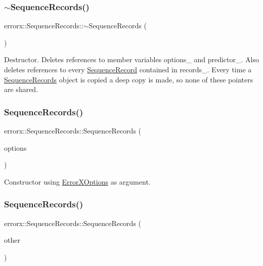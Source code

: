 \subsubsection{\texorpdfstring{$\sim$\+Sequence\+Records()}{~SequenceRecords()}}
{\footnotesize\ttfamily errorx\+::\+Sequence\+Records\+::$\sim$\+Sequence\+Records (\begin{DoxyParamCaption}{ }\end{DoxyParamCaption})}

Destructor. Deletes references to member variables options\+\_\+ and predictor\+\_\+. Also deletes references to every \mbox{\hyperlink{classerrorx_1_1_sequence_record}{Sequence\+Record}} contained in records\+\_\+. Every time a \mbox{\hyperlink{classerrorx_1_1_sequence_records}{Sequence\+Records}} object is copied a deep copy is made, so none of these pointers are shared. \mbox{\label{classerrorx_1_1_sequence_records_af45d18ad4ff7f3348289f640e3d6ebca}} 
\subsubsection{\texorpdfstring{Sequence\+Records()}{SequenceRecords()}\hspace{0.1cm}{\footnotesize\ttfamily [1/4]}}
{\footnotesize\ttfamily errorx\+::\+Sequence\+Records\+::\+Sequence\+Records (\begin{DoxyParamCaption}\item[{\mbox{\hyperlink{classerrorx_1_1_error_x_options}{Error\+X\+Options}} const \&}]{options }\end{DoxyParamCaption})}

Constructor using \mbox{\hyperlink{classerrorx_1_1_error_x_options}{Error\+X\+Options}} as argument. \mbox{\label{classerrorx_1_1_sequence_records_ae5f0b141e16902f008d5dc65cef492ef}} 
\subsubsection{\texorpdfstring{Sequence\+Records()}{SequenceRecords()}\hspace{0.1cm}{\footnotesize\ttfamily [2/4]}}
{\footnotesize\ttfamily errorx\+::\+Sequence\+Records\+::\+Sequence\+Records (\begin{DoxyParamCaption}\item[{\mbox{\hyperlink{classerrorx_1_1_sequence_records}{Sequence\+Records}} const \&}]{other }\end{DoxyParamCaption})}

